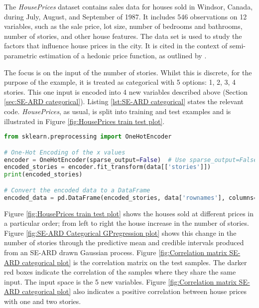 \documentclass[12pt,a4paper]{article}
\begin{document}
The \textit{HousePrices} dataset contains sales data for houses sold in Windsor, Canada, during July, August, and September of 1987. It includes 546 observations on 12 variables, such as the sale price, lot size, number of bedrooms and bathrooms, number of stories, and other house features. The data set is used to study the factors that influence house prices in the city. It is cited in the context of semi-parametric estimation of a hedonic price function, as outlined by \citet{anglin1996semiparametric}.

The focus is on the input of the number of stories. Whilst this is discrete, for the purpose of the example, it is treated as categorical with 5 options: 1, 2, 3, 4 stories. This one input is encoded into 4 new variables described above (Section \ref{sec:SE-ARD categorical}). Listing \ref{lst:SE-ARD categorical} states the relevant code. \textit{HousePrices}, as usual, is split into training and test examples and is illustrated in Figure \ref{fig:HousePrices train test plot}. 

\vspace{20pt}
\begin{lstlisting}[language=python, caption={Code of encoding cateogrical variable into spearate binary variables.}, label={lst:SE-ARD categorical}]
from sklearn.preprocessing import OneHotEncoder

# One-Hot Encoding of the x values
encoder = OneHotEncoder(sparse_output=False)  # Use sparse_output=False for dense array
encoded_stories = encoder.fit_transform(data[['stories']])
print(encoded_stories)

# Convert the encoded data to a DataFrame
encoded_data = pd.DataFrame(encoded_stories, data['rownames'], columns=encoder.categories_[0])
\end{lstlisting}


Figure \ref{fig:HousePrices train test plot} shows the houses sold at different prices in a particular order; from left to right the house increase in the number of stories. Figure \ref{fig:SE-ARD Categorical GPregression plot}  shows this change in the number of stories through the predictive mean and credible intervals produced from an SE-ARD drawn Gaussian process. Figure \ref{fig:Correlation matrix SE-ARD categorical plot} is the correlation matrix on the test samples. The darker red boxes indicate the correlation of the samples where they share the same input. The input space is the 5 new variables. Figure \ref{fig:Correlation matrix SE-ARD categorical plot} also indicates a positive correlation between house prices with one and two stories. 
\end{document}
